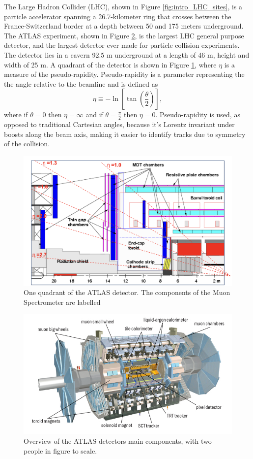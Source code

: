 The Large Hadron Collider (LHC), shown in Figure \ref{fig:intro_LHC_sites},  is a particle accelerator spanning a 26.7-kilometer ring that crosses between the France-Switzerland border at a depth between 50 and 175 meters underground.\cite{Brüning:782076}
The ATLAS experiment, shown in Figure \ref{fig:intro_ATLAS_detector}, is the largest LHC general purpose detector, and the largest detector ever made for particle collision experiments. 
The detector lies in a cavern 92.5 m underground at a length of 46 m, height and width of 25 m.\cite{ATLAS_Tech_Proposal}
A quadrant of the detector is shown in Figure \ref{fig:ATLAS_quadrant}, where $\eta$ is a measure of the pseudo-rapidity.
Pseudo-rapidity is a parameter representing the the angle relative to the beamline and is defined as
\begin{equation}
    \eta \equiv -\ln\left[ \tan\left(\frac{\theta}{2}\right)\right],
\end{equation}  
where if $\theta = 0$ then $\eta = \infty$ and if $\theta = \frac{\pi}{2}$ then $\eta = 0$.
Pseudo-rapidity is used, as opposed to traditional Cartesian angles, because it's Lorentz invariant under boosts along the beam axis, making it easier to identify tracks due to symmetry of the collision.  
\begin{figure}[h!]
    \centering
    \includegraphics[width=.8\textwidth]{content/img/ATLAS qudrant labelled MS.png}
    \caption{One quadrant of the ATLAS detector. The components of the Muon Spectrometer are labelled \cite{Hough_Transform_CSC}}
    \label{fig:ATLAS_quadrant}
\end{figure}

\begin{figure}[h]
    \centering
    \includegraphics[width=.8\textwidth]{content/img/ATLAS_Detector.jpg}
    \caption{Overview of the ATLAS detectors main components, with two people in figure to scale.\cite{ATLAS_Illustration}}
    \label{fig:intro_ATLAS_detector}
\end{figure}

